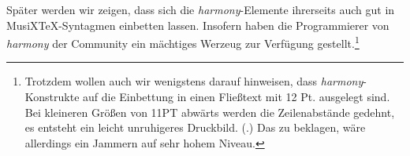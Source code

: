 Später werden wir zeigen, dass sich die \textit{harmony}-Elemente ihrerseits
auch gut in MusiX\TeX-Syntagmen einbetten lassen. Insofern haben die
Programmierer von \textit{harmony} der Community ein mächtiges Werzeug zur
Verfügung gestellt.\footnote{Trotzdem wollen auch wir wenigstens darauf
hinweisen, dass \textit{harmony}-Konstrukte auf die Einbettung in einen
Fließtext mit 12 Pt. ausgelegt sind. Bei kleineren Größen von 11PT abwärts
werden die Zeilenabstände gedehnt, es entsteht ein leicht unruhigeres
Druckbild. (\cite[Vgl. dazu][2]{WegWeg2007a}.) Das zu beklagen, wäre allerdings
ein Jammern auf sehr hohem Niveau.}


%
